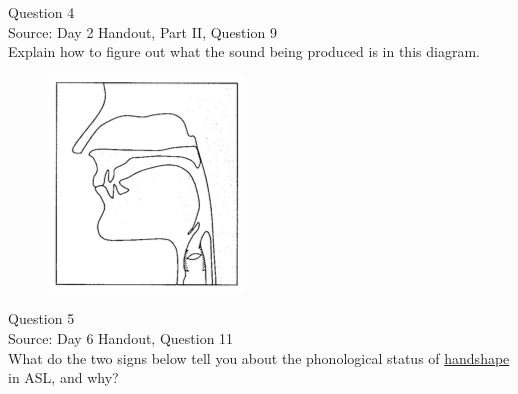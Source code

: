 \documentclass[12pt]{article}
\begin{document}
\newpage

{\large Question 4}\\

Source: Day 2 Handout, Part II, Question 9\\

Explain how to figure out what the sound being produced is in this diagram.\\

\begin{figure}[H]
\includegraphics{../images/sagittal_p.png}
\end{figure}

\newpage

{\large Question 5}\\

Source: Day 6 Handout, Question 11\\

What do the two signs below tell you about the phonological status of \underline{handshape} in ASL, and why?\\
\end{document}
